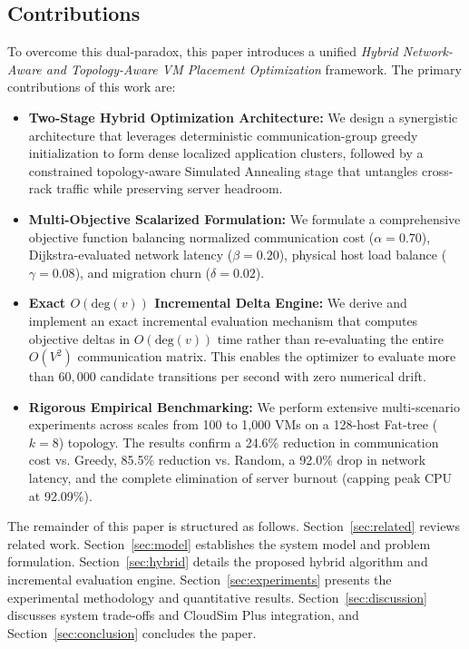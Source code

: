 \documentclass[conference]{IEEEtran}
\begin{document}
\subsection{Contributions}
To overcome this dual-paradox, this paper introduces a unified \emph{Hybrid Network-Aware and Topology-Aware VM Placement Optimization} framework. The primary contributions of this work are:
\begin{itemize}
    \item \textbf{Two-Stage Hybrid Optimization Architecture:} We design a synergistic architecture that leverages deterministic communication-group greedy initialization to form dense localized application clusters, followed by a constrained topology-aware Simulated Annealing stage that untangles cross-rack traffic while preserving server headroom.
    \item \textbf{Multi-Objective Scalarized Formulation:} We formulate a comprehensive objective function balancing normalized communication cost ($\alpha = 0.70$), Dijkstra-evaluated network latency ($\beta = 0.20$), physical host load balance ($\gamma = 0.08$), and migration churn ($\delta = 0.02$).
    \item \textbf{Exact $O(\mathrm{deg}(v))$ Incremental Delta Engine:} We derive and implement an exact incremental evaluation mechanism that computes objective deltas in $O(\mathrm{deg}(v))$ time rather than re-evaluating the entire $O(V^2)$ communication matrix. This enables the optimizer to evaluate more than $60,000$ candidate transitions per second with zero numerical drift.
    \item \textbf{Rigorous Empirical Benchmarking:} We perform extensive multi-scenario experiments across scales from 100 to 1,000 VMs on a 128-host Fat-tree ($k=8$) topology. The results confirm a 24.6\% reduction in communication cost vs. Greedy, 85.5\% reduction vs. Random, a 92.0\% drop in network latency, and the complete elimination of server burnout (capping peak CPU at 92.09\%).
\end{itemize}

The remainder of this paper is structured as follows. Section~\ref{sec:related} reviews related work. Section~\ref{sec:model} establishes the system model and problem formulation. Section~\ref{sec:hybrid} details the proposed hybrid algorithm and incremental evaluation engine. Section~\ref{sec:experiments} presents the experimental methodology and quantitative results. Section~\ref{sec:discussion} discusses system trade-offs and CloudSim Plus integration, and Section~\ref{sec:conclusion} concludes the paper.
\end{document}
